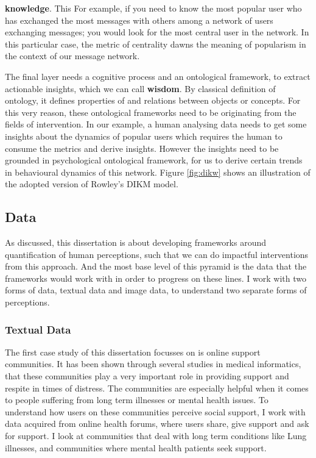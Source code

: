 \textbf{knowledge}. This  For example, if you need to know the most popular user who has exchanged the most messages with others among a network of users exchanging messages; you would look for the most central user in the network. In this particular case, the metric of centrality dawns the meaning of popularism in the context of our message network. 

The final layer needs a cognitive process and an ontological framework, to extract actionable insights, which we can call \textbf{wisdom}. By classical definition of ontology, it defines properties of and relations between objects or concepts. For this very reason, these ontological frameworks need to be originating from the fields of intervention.  In our example, a human analysing data needs to get some insights about the dynamics of popular users which requires the human to consume the metrics and derive insights. However the insights need to be grounded in psychological ontological framework, for us to derive certain trends in behavioural dynamics of this network.  Figure \ref{fig:dikw} shows an illustration of the adopted version of Rowley's DIKM model. 

\subsection{Data}
As discussed, this dissertation is about developing frameworks around quantification of human perceptions, such that we can do impactful interventions from this approach. And the most base level of this pyramid is the data that the frameworks would work with in order to progress on these lines. I work with two forms of data, textual data and image data, to understand two separate forms of perceptions. 

\subsubsection{Textual Data}
The first case study of this dissertation focusses on is online support communities. It has been shown through several studies in medical informatics, that these communities play a very important role in providing support and respite in times of distress. The communities are especially helpful when it comes to people suffering from long term illnesses or mental health issues. 
To understand how users on these communities perceive social support, I work with data acquired from online health forums, where users share, give support and ask for support. I look at communities that deal with long term conditions like Lung illnesses, and communities where mental health patients seek support. 

